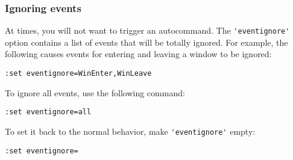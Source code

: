 \subsubsection{Ignoring events}
At times, you will not want to trigger an autocommand.
The \verb!'eventignore'! option contains a list of events that will be totally ignored.
For example, the following causes events for entering and leaving a window to be ignored:

\begin{Verbatim}[samepage=true]
 :set eventignore=WinEnter,WinLeave
\end{Verbatim}

To ignore all events, use the following command:

\begin{Verbatim}[samepage=true]
 :set eventignore=all
\end{Verbatim}

To set it back to the normal behavior, make \verb!'eventignore'! empty:

\begin{Verbatim}[samepage=true]
 :set eventignore=
\end{Verbatim}
\clearpage
